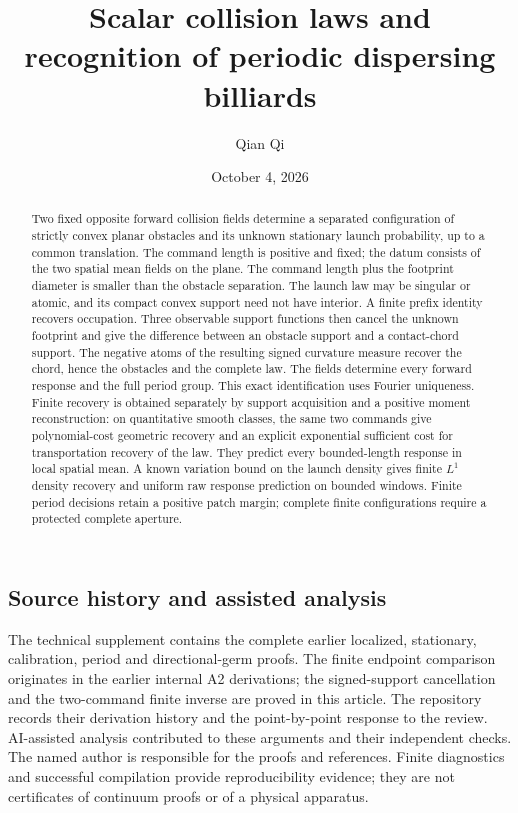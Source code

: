 \documentclass[11pt]{amsart}
\title[Scalar collision laws]{Scalar collision laws and recognition of periodic dispersing billiards}
\author{Qian Qi}
\date{October 4, 2026}
\begin{document}
\raggedbottom
\begin{abstract}
Two fixed opposite forward collision fields determine a separated
configuration of strictly convex planar obstacles and its unknown
stationary launch probability, up to a common translation. The command
length is positive and fixed; the datum consists of the two spatial
mean fields on the plane. The command length plus the footprint
diameter is smaller than the obstacle separation.
The launch law may be singular or atomic,
and its compact convex support need not have interior. A finite prefix
identity recovers occupation. Three observable support functions then
cancel the unknown footprint and give the difference between an
obstacle support and a contact-chord support. The negative atoms of
the resulting signed curvature measure recover the chord, hence the
obstacles and the complete law. The fields determine every forward
response and the full period group. This exact identification uses
Fourier uniqueness. Finite recovery is obtained separately by support
acquisition and a positive moment reconstruction: on quantitative smooth
classes, the same two commands give polynomial-cost geometric recovery
and an explicit exponential sufficient cost for transportation recovery
of the law. They predict every bounded-length response in local spatial
mean. A known variation bound on the launch density gives finite
\(L^1\) density recovery and uniform raw response prediction on bounded
windows. Finite period decisions retain a positive patch margin;
complete finite configurations require a protected complete aperture.
\end{abstract}
\maketitle
\enlargethispage{2pt}





\appendix


\subsection*{Source history and assisted analysis}
The technical supplement contains the complete earlier localized,
stationary, calibration, period and directional-germ proofs. The
finite endpoint comparison originates in the earlier internal A2
derivations; the signed-support cancellation and the two-command
finite inverse are proved in this article. The repository records
their derivation history and the point-by-point response to the review.
AI-assisted analysis contributed to these arguments and their
independent checks. The named author is responsible for the proofs
and references. Finite diagnostics and successful compilation provide
reproducibility evidence; they are not certificates of continuum
proofs or of a physical apparatus.

\end{document}
